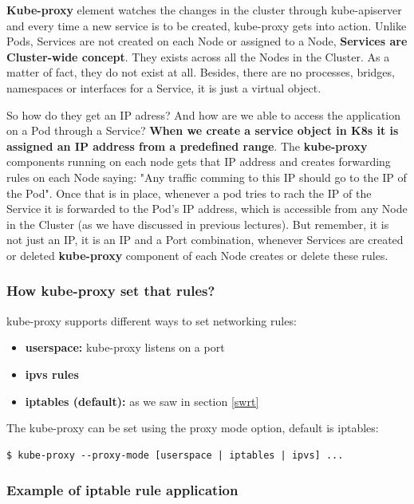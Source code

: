 \documentclass{article}
\newenvironment{codetemplate}[1][]{%
  \mybasecolorbox[#1]
  \itshape
}{%
  \endmybasecolorbox
}
\begin{document}
\textbf{Kube-proxy} element watches the changes in the cluster through kube-apiserver and every time a new service is to be created, kube-proxy gets into action. Unlike Pods, Services are not created on each Node or assigned to a Node, \textbf{Services are Cluster-wide concept}. They exists across all the Nodes in the Cluster. As a matter of fact, they do not exist at all. Besides, there are no processes, bridges, namespaces or interfaces for a Service, it is just a virtual object. 

So how do they get an IP adress? And how are we able to access the application on a Pod through a Service? \textbf{When we create a service object in K8s it is assigned an IP address from a predefined range}. The \textbf{kube-proxy} components running on each node gets that IP address and creates forwarding rules on each Node saying: "Any traffic comming to this IP should go to the IP of the Pod". Once that is in place, whenever a pod tries to rach the IP of the Service it is forwarded to the Pod's IP address, which is accessible from any Node in the Cluster (as we have discussed in previous lectures). But remember, it is not just an IP, it is an IP and a Port combination, whenever Services are created or deleted \textbf{kube-proxy} component of each Node creates or delete these rules.

\subsubsection{How kube-proxy set that rules?}

kube-proxy supports different ways to set networking rules:

\begin{itemize}
    \item \textbf{userspace:} kube-proxy listens on a port
    \item \textbf{ipvs rules}
    \item \textbf{iptables (default):} as we saw in section \ref{swrt}
\end{itemize}

The kube-proxy can be set using the proxy mode option, default is iptables:

\begin{codetemplate}{}
\begin{verbatim}
$ kube-proxy --proxy-mode [userspace | iptables | ipvs] ...
\end{verbatim}
\end{codetemplate}

\subsubsection{Example of iptable rule application}
\end{document}
